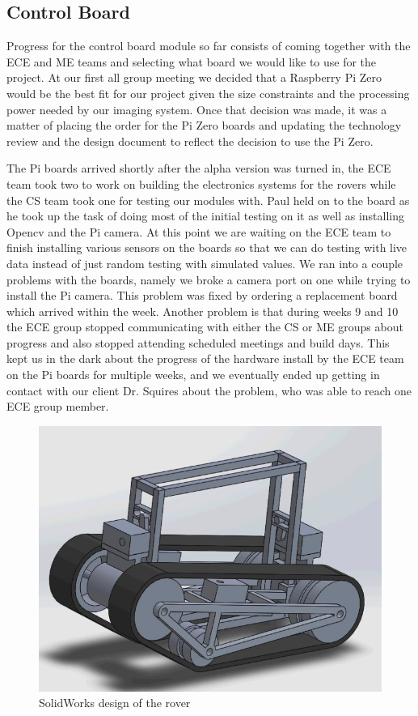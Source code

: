 \documentclass[10pt,letterpaper,onecolumn,draftclsnofoot,journal]{IEEEtran}
\begin{document}
\subsection{Control Board}
Progress for the control board module so far consists of coming together with the ECE and ME teams and selecting what board we would like to use for the project. At our first all group meeting we decided that a Raspberry Pi Zero would be the best fit for our project given the size constraints and the processing power needed by our imaging system. Once that decision was made, it was a matter of placing the order for the Pi Zero boards and updating the technology review and the design document to reflect the decision to use the Pi Zero.
\par
The Pi boards arrived shortly after the alpha version was turned in, the ECE team took two to work on building the electronics systems for the rovers while the CS team took one for testing our modules with. Paul held on to the board as he took up the task of doing most of the initial testing on it as well as installing Opencv and the Pi camera. At this point we are waiting on the ECE team to finish installing various sensors on the boards so that we can do testing with live data instead of just random testing with simulated values. We ran into a couple problems with the boards, namely we broke a camera port on one while trying to install the Pi camera. This problem was fixed by ordering a replacement board which arrived within the week. Another problem is that during weeks 9 and 10 the ECE group stopped communicating with either the CS or ME groups about progress and also stopped attending scheduled meetings and build days. This kept us in the dark about the progress of the hardware install by the ECE team on the Pi boards for multiple weeks, and we eventually ended up getting in contact with our client Dr. Squires about the problem, who was able to reach one ECE group member.
\begin{figure}[H]
	\centering
	\includegraphics[scale = .4]{Capture.PNG}
	\caption{SolidWorks design of the rover}
	\label{fig:design}
\end{figure}
\end{document}
